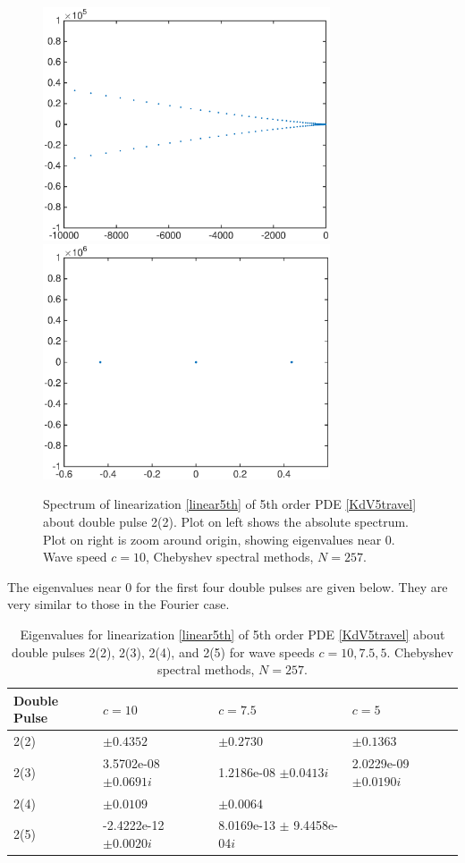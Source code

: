 \documentclass[12pt]{article}
\begin{document}
\begin{figure}[H]
	\includegraphics[width=8.5cm]{cheb10ud2_2}
	\includegraphics[width=8.5cm]{cheb10ud2_2zoom}
	\caption{Spectrum of linearization \eqref{linear5th} of 5th order PDE \eqref{KdV5travel} about double pulse 2(2). Plot on left shows the absolute spectrum. Plot on right is zoom around origin, showing eigenvalues near 0. Wave speed $c = 10$, Chebyshev spectral methods, $N = 257$.}
\end{figure}

The eigenvalues near 0 for the first four double pulses are given below. They are very similar to those in the Fourier case.

\begin{table}[H]
\begin{tabular}{l|lll}
 Double Pulse   & $c = 10$            & $c=7.5$                        & $c=5$        \\ \hline
  2(2) &     $\pm 0.4352$             & $\pm 0.2730$                   & $\pm 0.1363$ \\ 
  2(3) &     3.5702e-08 $\pm 0.0691i$ & 1.2186e-08 $\pm 0.0413i$       & 2.0229e-09 $\pm 0.0190i$\\ 
  2(4) &     $\pm 0.0109$             & $\pm 0.0064$                   & \\ 
  2(5) &    -2.4222e-12 $\pm 0.0020i$ & 8.0169e-13 $\pm$ 9.4458e-04$i$ & \\
\end{tabular}
\caption{Eigenvalues for linearization \eqref{linear5th} of 5th order PDE \eqref{KdV5travel} about double pulses 2(2), 2(3), 2(4), and 2(5) for wave speeds $c = 10, 7.5, 5$. Chebyshev spectral methods, $N = 257$.}
\end{table}
\end{document}
